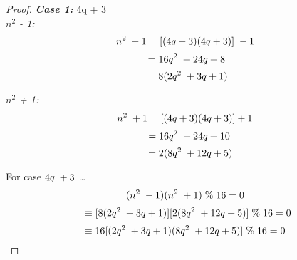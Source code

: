 \documentclass[12pt]{article}
\begin{document}
\begin{proof}
\textbf{\textit{Case 1:}} 4q + 3 \\

\textit{$n^2$ - 1:}
\begin{equation}
n^2  \hspace{.1cm} - 1 = [(4q + 3)(4q + 3)]  \hspace{.1cm} - 1 
\end{equation}
\begin{equation}
\hspace{.1cm}= 16q^2  \hspace{.1cm} + 24q + 8 \\
\end{equation}
\begin{equation}
\hspace{.2cm} = 8(2q^2  \hspace{.1cm} + 3q + 1)
\end{equation}

\textit{$n^2$ + 1:}
\begin{equation}
n^2 \hspace{.1cm} + 1 = [(4q + 3)(4q + 3)] + 1
\end{equation}
\begin{equation}
\hspace{.3cm}= 16q^2 \hspace{.1cm} + 24q + 10
\end{equation}
\begin{equation}
\hspace{.4cm}= 2(8q^2 \hspace{.1cm} + 12q + 5)
\end{equation}
\bigskip

For case $4q \hspace{.1cm} + 3$ \ldots
\begin{equation}
(n^2 \hspace{.1cm} -1)(n^2 \hspace{.1cm} + 1) \hspace{.1cm} \% \hspace{.1cm} 16 = 0
\end{equation}
\begin{equation}
\hspace{.2cm}\equiv [8(2q^2 \hspace{.1cm} + 3q + 1)][2(8q^2 \hspace{.1cm} + 12q + 5)] \hspace{.1cm} \% \hspace{.1cm} 16 = 0
\end{equation}
\begin{equation}
\equiv 16[(2q^2 \hspace{.1cm} + 3q + 1)(8q^2 \hspace{.1cm} + 12q + 5)] \hspace{.1cm} \% \hspace{.1cm} 16 = 0
\end{equation}
\bigskip


\end{proof}
\end{document}
